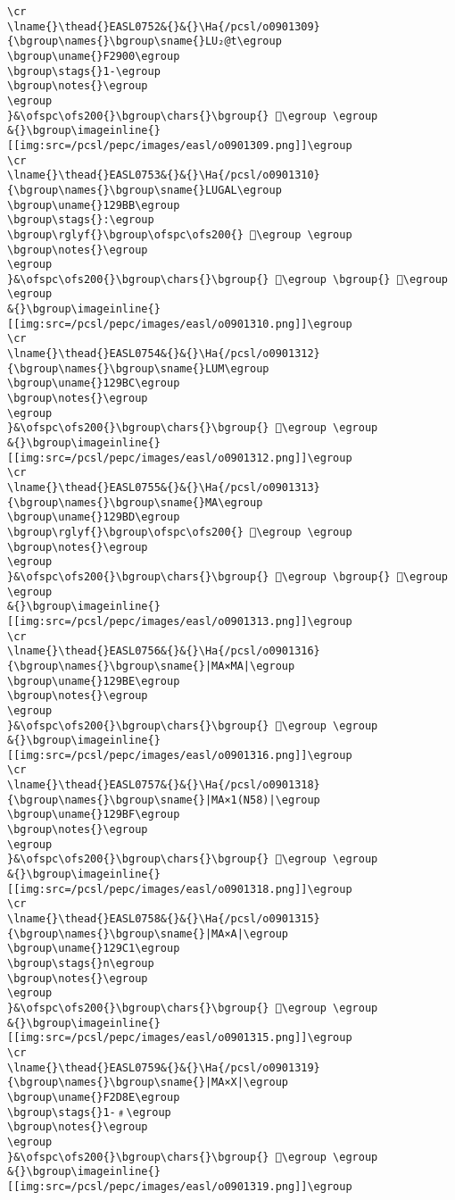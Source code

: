 \begin{verbatim}
\cr
\lname{}\thead{}EASL0752&{}&{}\Ha{/pcsl/o0901309}{\bgroup\names{}\bgroup\sname{}LU₂@t\egroup
\bgroup\uname{}F2900\egroup
\bgroup\stags{}1-\egroup
\bgroup\notes{}\egroup
\egroup
}&\ofspc\ofs200{}\bgroup\chars{}\bgroup{} 󲤀\egroup \egroup
&{}\bgroup\imageinline{}[[img:src=/pcsl/pepc/images/easl/o0901309.png]]\egroup
\cr
\lname{}\thead{}EASL0753&{}&{}\Ha{/pcsl/o0901310}{\bgroup\names{}\bgroup\sname{}LUGAL\egroup
\bgroup\uname{}129BB\egroup
\bgroup\stags{}:\egroup
\bgroup\rglyf{}\bgroup\ofspc\ofs200{} 𒦻\egroup \egroup
\bgroup\notes{}\egroup
\egroup
}&\ofspc\ofs200{}\bgroup\chars{}\bgroup{} 𒦺\egroup \bgroup{} 𒦻\egroup \egroup
&{}\bgroup\imageinline{}[[img:src=/pcsl/pepc/images/easl/o0901310.png]]\egroup
\cr
\lname{}\thead{}EASL0754&{}&{}\Ha{/pcsl/o0901312}{\bgroup\names{}\bgroup\sname{}LUM\egroup
\bgroup\uname{}129BC\egroup
\bgroup\notes{}\egroup
\egroup
}&\ofspc\ofs200{}\bgroup\chars{}\bgroup{} 𒦼\egroup \egroup
&{}\bgroup\imageinline{}[[img:src=/pcsl/pepc/images/easl/o0901312.png]]\egroup
\cr
\lname{}\thead{}EASL0755&{}&{}\Ha{/pcsl/o0901313}{\bgroup\names{}\bgroup\sname{}MA\egroup
\bgroup\uname{}129BD\egroup
\bgroup\rglyf{}\bgroup\ofspc\ofs200{} 𒦽\egroup \egroup
\bgroup\notes{}\egroup
\egroup
}&\ofspc\ofs200{}\bgroup\chars{}\bgroup{} 𒦽\egroup \bgroup{} 𒧀\egroup \egroup
&{}\bgroup\imageinline{}[[img:src=/pcsl/pepc/images/easl/o0901313.png]]\egroup
\cr
\lname{}\thead{}EASL0756&{}&{}\Ha{/pcsl/o0901316}{\bgroup\names{}\bgroup\sname{}|MA×MA|\egroup
\bgroup\uname{}129BE\egroup
\bgroup\notes{}\egroup
\egroup
}&\ofspc\ofs200{}\bgroup\chars{}\bgroup{} 𒦾\egroup \egroup
&{}\bgroup\imageinline{}[[img:src=/pcsl/pepc/images/easl/o0901316.png]]\egroup
\cr
\lname{}\thead{}EASL0757&{}&{}\Ha{/pcsl/o0901318}{\bgroup\names{}\bgroup\sname{}|MA×1(N58)|\egroup
\bgroup\uname{}129BF\egroup
\bgroup\notes{}\egroup
\egroup
}&\ofspc\ofs200{}\bgroup\chars{}\bgroup{} 𒦿\egroup \egroup
&{}\bgroup\imageinline{}[[img:src=/pcsl/pepc/images/easl/o0901318.png]]\egroup
\cr
\lname{}\thead{}EASL0758&{}&{}\Ha{/pcsl/o0901315}{\bgroup\names{}\bgroup\sname{}|MA×A|\egroup
\bgroup\uname{}129C1\egroup
\bgroup\stags{}n\egroup
\bgroup\notes{}\egroup
\egroup
}&\ofspc\ofs200{}\bgroup\chars{}\bgroup{} 𒧁\egroup \egroup
&{}\bgroup\imageinline{}[[img:src=/pcsl/pepc/images/easl/o0901315.png]]\egroup
\cr
\lname{}\thead{}EASL0759&{}&{}\Ha{/pcsl/o0901319}{\bgroup\names{}\bgroup\sname{}|MA×X|\egroup
\bgroup\uname{}F2D8E\egroup
\bgroup\stags{}1-﹟\egroup
\bgroup\notes{}\egroup
\egroup
}&\ofspc\ofs200{}\bgroup\chars{}\bgroup{} 󲶎\egroup \egroup
&{}\bgroup\imageinline{}[[img:src=/pcsl/pepc/images/easl/o0901319.png]]\egroup

\end{verbatim}
